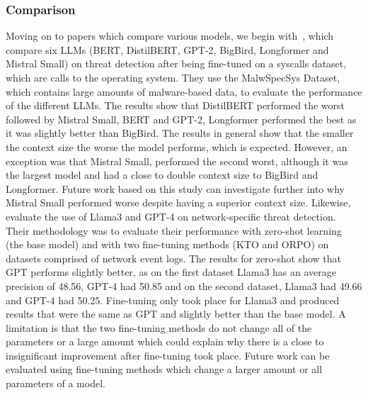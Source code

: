 \subsubsection{Comparison}
Moving on to papers which compare various models, we begin with~\cite{sanchez2024transfer}, which compare six LLMs (BERT, DistilBERT, GPT-2, BigBird, Longformer and Mistral Small) on threat detection after being fine-tuned on a syscalls dataset, which are calls to the operating system. They use the MalwSpecSys Dataset, which contains large amounts of malware-based data, to evaluate the performance of the different LLMs. The results show that DistilBERT performed the worst followed by Mistral Small, BERT and GPT-2, Longformer performed the best as it was slightly better than BigBird. The results in general show that the smaller the context size the worse the model performs, which is expected. However, an exception was that Mistral Small, performed the second worst, although it was the largest model and had a close to double context size to BigBird and Longformer. Future work based on this study can investigate further into why Mistral Small performed worse despite having a superior context size. Likewise,~\cite{houssel2024towards} evaluate the use of Llama3 and GPT-4 on network-specific threat detection. Their methodology was to evaluate their performance with zero-shot learning (the base model) and with two fine-tuning methods (KTO and ORPO) on datasets comprised of network event logs. The results for zero-shot show that GPT performs slightly better, as on the first dataset Llama3 has an average precision of 48.56, GPT-4 had 50.85 and on the second dataset, Llama3 had 49.66 and GPT-4 had 50.25. Fine-tuning only took place for Llama3 and produced results that were the same as GPT and slightly better than the base model. A limitation is that the two fine-tuning methods do not change all of the parameters or a large amount which could explain why there is a close to insignificant improvement after fine-tuning took place. Future work can be evaluated using fine-tuning methods which change a larger amount or all parameters of a model.


